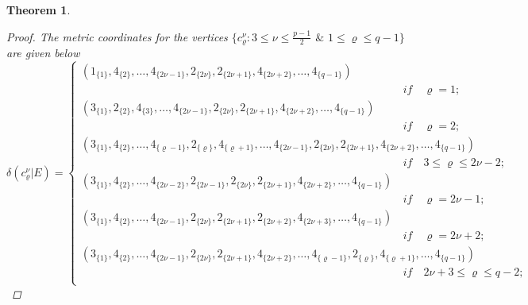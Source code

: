 \documentclass[]{interact}
\theoremstyle{plain}%
\newtheorem{theorem}{Theorem}[section]
\theoremstyle{definition}
\theoremstyle{remark}
\begin{document}
\begin{theorem}
\begin{proof}
                     \noindent The metric coordinates for the vertices 
                     $\{c^\nu_\varrho:3\leq \nu\leq \frac{p-1}{2}$  $\&$  $1\leq \varrho\leq q-1 \}$ are given below
                        \begin{equation*}
                        \delta(c^{\nu}_{\varrho}|E)=
                   \begin{cases}
                   (1_{\{1\}},4_{\{2\}},\ldots, 4_{\{2\nu-1\}},2_{\{2\nu\}},2_{\{2\nu+1\}},4_{\{2\nu+2\}},\ldots,4_{\{q-1\}})\\
\qquad  \qquad \qquad \qquad \qquad \qquad \qquad \qquad \qquad \qquad  \qquad \qquad\qquad\qquad\quad \textit{if}\quad \varrho= 1;\\
                     (3_{\{1\}},2_{\{ 2 \}},4_{\{3\}}, \ldots, 4_{\{2\nu-1\}},2_{\{2\nu\}},2_{\{2\nu+1\}},4_{\{2\nu+2\}},\ldots,4_{\{q-1\}})\\
\qquad  \qquad \qquad \qquad \qquad \qquad \qquad \qquad \qquad \qquad  \qquad \qquad\qquad\qquad\quad \textit{if}\quad\varrho= 2;\\
                   (3_{\{1\}},4_{\{2\}}, \ldots,4_{\{\varrho-1 \}},2_{\{ \varrho \}},4_{\{\varrho +1\}}, \ldots, 4_{\{2\nu-1\}},2_{\{2\nu\}},2_{\{2\nu+1\}},4_{\{2\nu+2\}},\ldots,4_{\{q-1\}})\\
                   \qquad  \qquad \qquad \qquad \qquad \qquad \qquad \qquad \qquad \qquad  \qquad \qquad\qquad\qquad\quad \textit{if}\quad  3 \leq  \varrho  \leq 2\nu-2  ;\\
                      (3_{\{1\}},4_{\{2\}}, \ldots,4_{\{2\nu-2 \}},2_{\{ 2\nu-1 \}},2_{\{2\nu\}},2_{\{2\nu+1\}},4_{\{2\nu+2\}},\ldots,4_{\{q-1\}})\\
\qquad  \qquad \qquad \qquad \qquad \qquad \qquad \qquad \qquad \qquad  \qquad \qquad\qquad\qquad\quad\textit{if}\quad \varrho= 2\nu-1 ;\\
                     (3_{\{1\}},4_{\{2\}}, \ldots,4_{\{2\nu-1\}},2_{\{2\nu\}},2_{\{2\nu+1\}},2_{\{ 2\nu+2 \}}, 4_{\{2\nu+3 \}},\ldots,4_{\{q-1\}})\\
\qquad  \qquad \qquad \qquad \qquad \qquad \qquad \qquad \qquad \qquad  \qquad \qquad\qquad\qquad\quad \textit{if}\quad \varrho= 2\nu+2 ;\\
                    (3_{\{1\}},4_{\{2\}}, \ldots,4_{\{2\nu-1\}},2_{\{2\nu\}},2_{\{2\nu+1\}},4_{\{2\nu+2\}},\ldots,4_{\{\varrho-1 \}},2_{\{ \varrho \}},4_{\{\varrho +1\}},\ldots,4_{\{q-1\}})\\
\qquad  \qquad \qquad \qquad \qquad \qquad \qquad \qquad \qquad \qquad  \qquad \qquad\qquad\qquad\quad \textit{if}\quad 2\nu+3 \leq  \varrho  \leq q-2  ;\\

\end{cases}
\end{equation*}
\end{proof}
\end{theorem}
\end{document}
